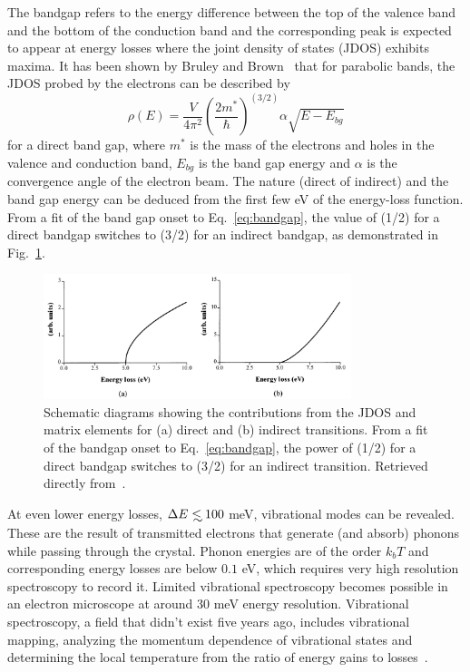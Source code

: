 The  bandgap  refers  to  the  energy  difference between the top of the valence band 
and the bottom of the conduction band and the corresponding peak is expected to appear 
at energy losses where the joint density of states (JDOS) exhibits maxima. 
%
It has been shown by Bruley and Brown~\cite{Bruley:1987} that for parabolic bands, 
the JDOS probed by the electrons can be described by
\begin{equation}
\label{eq:bandgap}
    \rho(E) = \frac{V}{4\pi^2} \left( \frac{2m^*}{\hbar} \right)^{(3/2)} \alpha \sqrt{E-E_{bg}}
\end{equation}
for a direct band gap, where $m^*$ is the mass of the electrons and holes in the 
valence and conduction band, $E_{bg}$ is the band gap energy and $\alpha$ is the 
convergence angle of the electron beam.
The nature (direct of indirect) and the band gap energy can be deduced 
from the first few eV of the energy-loss function. 
%
From a fit of the band gap onset to Eq.~\ref{eq:bandgap}, 
the value of (1/2) for a direct bandgap switches to (3/2) for an indirect bandgap,
as demonstrated in Fig.~\ref{fig:bandgap}.

\begin{figure}[H]
    \centering
    \includegraphics[width=0.8\textwidth]{plots/bandgap.png}
    \caption{Schematic diagrams showing the contributions from the JDOS and matrix elements for (a) direct and (b) indirect transitions. From a fit of the bandgap onset to Eq.~\ref{eq:bandgap}, the power of (1/2) for a direct bandgap switches
    to (3/2) for an indirect transition.
    Retrieved directly from~\cite{Rafferty:1998}.}
    \label{fig:bandgap}
\end{figure}

At even lower energy losses, $\Delta E \lsim 100$ meV, vibrational modes can be revealed. 
These are the result of transmitted electrons that generate (and absorb) phonons 
while passing through the crystal. 
%
Phonon energies are of the order $k_bT$ and corresponding energy losses are below $0.1$ eV, 
which requires very high resolution spectroscopy to record it. 
%
Limited vibrational spectroscopy becomes possible in an electron microscope at around 30 meV 
energy resolution. 
%
Vibrational spectroscopy, a field that didn't exist five years ago, includes vibrational mapping, 
analyzing the momentum dependence of vibrational states and determining the local
temperature from the ratio of energy gains to losses~\cite{Krivanek:2009}.\\

